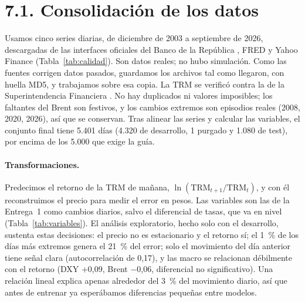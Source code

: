 \documentclass[11pt,letterpaper]{article}
\begin{document}
\section*{7.1. Consolidación de los datos}

Usamos cinco series diarias, de diciembre de 2003 a septiembre de 2026, descargadas de las interfaces oficiales del Banco de la República \cite{banrep}, FRED \cite{fred} y Yahoo Finance \cite{yahoo-dxy} (Tabla~\ref{tab:calidad}). Son datos reales; no hubo simulación. Como las fuentes corrigen datos pasados, guardamos los archivos tal como llegaron, con huella MD5, y trabajamos sobre esa copia. La TRM se verificó contra la de la Superintendencia Financiera \cite{superfin}. No hay duplicados ni valores imposibles; los faltantes del Brent son festivos, y los cambios extremos son episodios reales (2008, 2020, 2026), así que se conservan. Tras alinear las series y calcular las variables, el conjunto final tiene 5.401 días (4.320 de desarrollo, 1 purgado y 1.080 de test), por encima de los 5.000 que exige la guía.

\begin{table}[!htbp]
\centering\footnotesize
\setlength{\tabcolsep}{4pt}
\caption{Fuentes y calidad de las series. Hueco máx.: días seguidos sin dato. Extremos: cambios de más de 5 desviaciones estándar (TPM: más de 100 pb).}
\label{tab:calidad}

\end{table}

\paragraph{Transformaciones.} Predecimos el retorno de la TRM de mañana, $\ln(\mathrm{TRM}_{t+1}/\mathrm{TRM}_t)$, y con él reconstruimos el precio para medir el error en pesos. Las variables son las de la Entrega~1 como cambios diarios, salvo el diferencial de tasas, que va en nivel (Tabla~\ref{tab:variables}). El análisis exploratorio, hecho solo con el desarrollo, sustenta estas decisiones: el precio no es estacionario y el retorno sí; el 1~\% de los días más extremos genera el 21~\% del error; solo el movimiento del día anterior tiene señal clara (autocorrelación de 0,17), y las macro se relacionan débilmente con el retorno (DXY +0,09, Brent $-$0,06, diferencial no significativo). Una relación lineal explica apenas alrededor del 3~\% del movimiento diario, así que antes de entrenar ya esperábamos diferencias pequeñas entre modelos.
\end{document}
